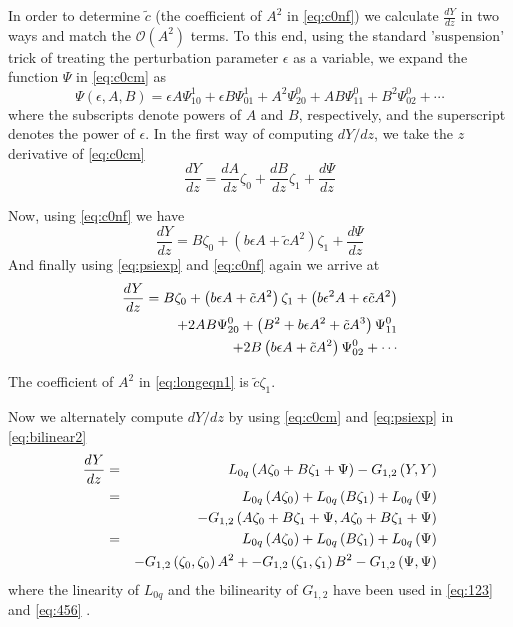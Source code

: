 In order to determine $\tilde{c}$ (the coefficient of $A^2$ in \eqref{eq:c0nf})
we calculate $\frac{dY}{dz}$ in two ways and match the $\mathcal{O}(A^2)$
terms.  To this end, using the standard 'suspension' trick of treating the
perturbation parameter $\epsilon$ as a variable, we expand the function $\Psi$
in \eqref{eq:c0cm} as 
\begin{equation}\label{eq:psiexp}
\Psi(\epsilon,A,B) = \epsilon A \Psi_{10}^1 + \epsilon B \Psi_{01}^1 + A^2 \Psi_{20}^0 + A B \Psi_{11}^0 + B^2 \Psi_{02}^0 + \cdots
\end{equation}
where the subscripts denote powers of $A$ and $B$, respectively, and the
superscript denotes the power of $\epsilon$.  In the first way of computing
$dY/dz$, we take the $z$ derivative of \eqref{eq:c0cm}
\begin{equation}
\frac{dY}{dz} = \frac{dA}{dz} \zeta_0 + \frac{dB}{dz} \zeta_1 + \frac{d\Psi}{dz}
\end{equation}

Now, using \eqref{eq:c0nf} we have
\begin{equation}
\frac{dY}{dz} = B \zeta_0 + \left(b \epsilon A + \tilde{c} A^2\right)\zeta_1 + \frac{d\Psi}{dz}
\end{equation}
And finally using \eqref{eq:psiexp} and \eqref{eq:c0nf} again we arrive at
\begin{align}
\frac{dY}{dz} = B \zeta_0 + \left(b \epsilon A + \tilde{c} A^2\right)\zeta_1 + \left( b \epsilon^2 A + \epsilon \tilde{c} A^2\right) \label{eq:longeqn1}\\
                + 2 A B\Psi_{20}^0 + \left( B^2 + b\epsilon A^2 + \tilde{c} A^3\right)\Psi_{11}^0 \notag \\ 
                + 2 B \left( b \epsilon A + \tilde{c} A^2 \right)\Psi_{02}^0 + \cdots \notag
\end{align}

The coefficient of $A^2$ in \eqref{eq:longeqn1} 
is $\tilde{c} \zeta_1 $. 

Now we alternately compute $dY/dz$ by using 
\eqref{eq:c0cm} and \eqref{eq:psiexp} in \eqref{eq:bilinear2}
\begin{align}\label{eq:dydz}
\frac{dY}{dz} &=& L_{0q}\left( A \zeta_0 + B \zeta_1 + \Psi \right) - G_{1,2}\left(Y,Y\right) \\
&=& L_{0q} \left(A\zeta_0\right) + L_{0q}\left(B\zeta_1\right) + L_{0q}\left(\Psi\right) \label{eq:123} \\
& & - G_{1,2}\left( A \zeta_0 + B \zeta_1 + \Psi ,A \zeta_0 + B \zeta_1 + \Psi \right) \notag \\
&=& L_{0q} \left(A\zeta_0\right) + L_{0q}\left(B\zeta_1\right) + L_{0q}\left(\Psi\right) \label{eq:456}  \\
& & - G_{1,2}\left(  \zeta_0, \zeta_0\right)A^2 + - G_{1,2}\left( \zeta_1, \zeta_1\right)B^2 -G_{1,2}\left( \Psi, \Psi\right) \notag
\end{align}
where the linearity of $L_{0q}$ and the bilinearity of $G_{1,2}$ have been used in \eqref{eq:123} and \eqref{eq:456} .

